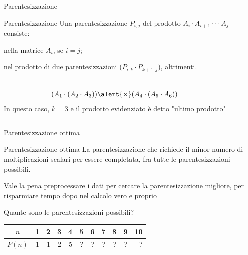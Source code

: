 \begin{frame}{Parentesizzazione}

\vspace{-6pt}
\begin{block}{Parentesizzazione}
Una \alert{parentesizzazione} $P_{i,j}$ del prodotto $A_i \cdot A_{i+1} \cdot \cdot \cdot A_j$ consiste:
\BI
\item nella matrice $A_i$, se $i = j$; 
\item nel prodotto di due parentesizzazioni ($P_{i,k} \cdot P_{k+1,j}$), altrimenti.
\EI
\end{block}

\begin{columns}[T]
\[
(A_1 \cdot (A_2 \cdot A_3 ))  \alert{\times}  (A_4 \cdot (A_5 \cdot A_6 )) 
\]
In questo caso, $k=3$ e il prodotto evidenziato 
è detto "\alert{ultimo prodotto}"
\vspace{-6pt}
\end{columns}

\end{frame}

\begin{frame}{Parentesizzazione ottima}

\vspace{-6pt}
\begin{block}{Parentesizzazione ottima}
La parentesizzazione che richiede il minor numero di moltiplicazioni scalari per essere completata, fra tutte le parentesizzazioni possibili.
\end{block}

\bigskip
{}
Vale la pena preprocessare i dati per cercare la parentesizzazione migliore, per risparmiare tempo dopo nel calcolo vero e proprio

\bigskip
{}
Quante sono le parentesizzazioni possibili?
\begin{center}
\begin{tabular}{|c|r|r|r|r|r|r|r|r|r|r|}
\hline
$n$ & \phantom{00}1 & \phantom{00}2 & \phantom{00}3 & \phantom{00}4 & \phantom{00}5 & \phantom{00}6 & \phantom{00}7 & \phantom{00}8 & \phantom{00}9 & \phantom{0}10 \\\hline
$P(n)$ & 1 & 1 & 2 & 5 & ? & ? & ? & ? & ? & ? \\\hline
\end{tabular}
\end{center}
\end{frame}

